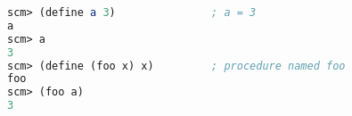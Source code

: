 \begin{lstlisting}[language=Scheme]
scm> (define a 3)               ; a = 3
a
scm> a
3
scm> (define (foo x) x)         ; procedure named foo
foo
scm> (foo a)
3
\end{lstlisting}